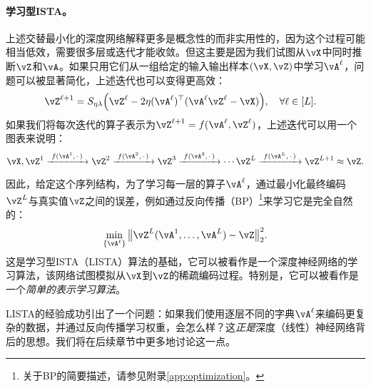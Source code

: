 \documentclass[../../book-main.tex]{subfiles}
\begin{document}
\paragraph{学习型ISTA。} 上述交替最小化的深度网络解释更多是概念性的而非实用性的，因为这个过程可能相当低效，需要很多层或迭代才能收敛。但这主要是因为我们试图从\(\vX\)中同时推断\(\vZ\)和\(\vA\)。如果只用它们从一组给定的输入输出样本\((\vX, \vZ)\)中学习\(\vA^\ell\)，问题可以被显著简化，上述迭代也可以变得更高效：
\begin{align}
    & \vZ^{\ell + 1} = S_{\eta\lambda}\rp{\vZ^{\ell} - 2\eta(\vA^{\ell})^{\top}(\vA^\ell\vZ^{\ell} - \vX)}, \quad \forall \ell \in [L].
\end{align}
如果我们将每次迭代的算子表示为$\vZ^{\ell + 1} = f(\vA^\ell, \vZ^\ell)$，上述迭代可以用一个图表来说明：
\begin{equation*}
\vX, \vZ^1 \xrightarrow{\hspace{1mm} f(\vA^1,\,\cdot\,) \hspace{1mm}}  \vZ^2 \xrightarrow{\hspace{1mm} f(\vA^2,\,\cdot\,) \hspace{1mm}}  \vZ^3  \xrightarrow{\hspace{1mm} f(\vA^3,\,\cdot\,) \hspace{1mm}} \cdots \vZ^{L}  \xrightarrow{\hspace{1mm} f(\vA^{L},\,\cdot\,) \hspace{1mm}} \vZ^{L + 1} \approx \vZ.  
\label{eqn:deep-sparse-encoding}
\end{equation*}

因此，给定这个序列结构，为了学习每一层的算子\(\vA^\ell\)，通过最小化最终编码$\vZ^L$与真实值$\vZ$之间的误差，例如通过反向传播（BP）\footnote{关于BP的简要描述，请参见附录\ref{app:optimization}。}来学习它是完全自然的：
\begin{equation}
    \min_{\{\vA^\ell\}} \big\|\vZ^L(\vA^1, \ldots, \vA^{L}) - \vZ\big\|_2^2.
\end{equation}
这是学习型ISTA（LISTA）算法\cite{gregor2010learning}的基础，它可以被看作是一个深度神经网络的学习算法，该网络试图模拟从$\vX$到$\vZ$的稀疏编码过程。特别是，它可以被看作是一个\textit{简单的表示学习算法}。


LISTA的经验成功引出了一个问题：如果我们使用逐层不同的字典\(\vA^\ell\)来编码更复杂的数据，并通过反向传播学习权重，会怎么样？这\textit{正是}深度（线性）神经网络背后的思想。我们将在后续章节中更多地讨论这一点。

\end{document}
